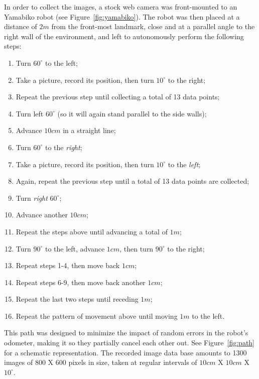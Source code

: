 \documentclass[twocolumn, 9pt]{jsproceedings}
\begin{document}
In order to collect the images, a stock web camera was front-mounted to an Yamabiko robot (see Figure~\ref{fig:yamabiko}). The robot was then placed at a distance of \(2m\) from the front-most landmark, close and at a parallel angle to the right wall of the environment, and left to autonomously perform the following steps:

\begin{enumerate}
\item Turn \(60^{\circ}\) to the left;
\item Take a picture, record its position, then turn \(10^{\circ}\) to the right;
\item Repeat the previous step until collecting a total of 13 data points;
\item Turn left \(60^{\circ}\) (so it will again stand parallel to the side walls);
\item Advance \(10cm\) in a straight line;
\item Turn \(60^{\circ}\) to the {\it right};
\item Take a picture, record its position, then turn \(10^{\circ}\) to the {\it left};
\item Again, repeat the previous step until a total of 13 data points are collected;
\item Turn {\it right} \(60^{\circ}\);
\item Advance another \(10cm\);
\item Repeat the steps above until advancing a total of \(1m\);
\item Turn \(90^{\circ}\) to the left, advance \(1cm\), then turn \(90^{\circ}\) to the right;
\item Repeat steps 1-4, then move back \(1cm\);
\item Repeat steps 6-9, then move back another \(1cm\);
\item Repeat the last two steps until receding \(1m\);
\item Repeat the pattern of movement above until moving \(1m\) to the left.
\end{enumerate}

This path was designed to minimize the impact of random errors in the robot's odometer, making it so they partially cancel each other out. See Figure~\ref{fig:path} for a schematic representation. The recorded image data base amounts to 1300 images of 800 X 600 pixels in size, taken at regular intervals of \(10cm\) X \(10cm\) X \(10^{\circ}\).
\end{document}
